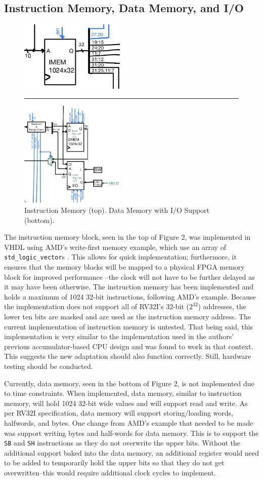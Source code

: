 \documentclass[lettersize,journal]{IEEEtran}
\begin{document}
\subsection{Instruction Memory,  Data Memory, and I/O}
\begin{figure}[!h]
    \label{fig:memory}
    \centering
    \includegraphics[width=5cm]{IMEM.jpg}
    \rule{7cm}{0.8pt}
    \includegraphics[width=5cm]{DMEM-IO.jpg}
    \caption{Instruction Memory (top). Data Memory with I/O Support (bottom).}
\end{figure}
The instruction memory block, seen in the top of Figure 2, was implemented in VHDL using AMD's write-first memory example, which use an array of \verb|std_logic_vector|s \cite{amdblockram}.
This allows for quick implementation; furthermore, it ensures that the memory blocks will be mapped to a physical FPGA memory block for improved performance
--the clock will not have to be further delayed as it may have been otherwise.
The instruction memory has been implemented and holds a maximum of 1024 32-bit instructions, following AMD's example.
Because the implementation does not support all of RV32I's 32-bit ($2^{32}$) addresses, the lower ten bits are masked and are used as the instruction memory address.
The current implementation of instruction memory is untested.
That being said, this implementation is very similar to the implementation used in the authors' previous accumulator-based CPU design and was found to work in that context.
This suggests the new adaptation should also function correctly.
Still, hardware testing should be conducted.

Currently, data memory, seen in the bottom of Figure 2, is not implemented due to time constraints.
When implemented, data memory, similar to instruction memory, will hold 1024 32-bit wide values and will support read and write.
As per RV32I specification, data memory will support storing/loading words, halfwords, and bytes.
One change from AMD's example that needed to be made was support writing bytes and half-words for data memory.
This is to support the \verb|SB| and \verb|SH| instructions as they do not overwrite the upper bits.
Without the additional support baked into the data memory,
an additional register would need to be added to temporarily hold the upper bits so that they do not get overwritten--this would require additional clock cycles to implement.
\end{document}
